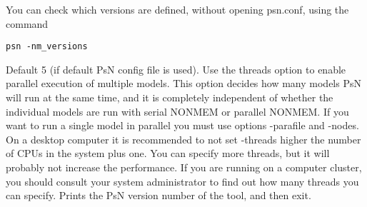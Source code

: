\begin{optionlist}
You can check which versions are defined, without opening psn.conf, using the command
\begin{verbatim}
psn -nm_versions
\end{verbatim}
\nextopt
{}
Default 5 (if default PsN config file is used). 
Use the threads option to enable parallel execution of multiple models.
This option decides how many models PsN will run at the same time, and it is completely
independent of whether the individual models are run with serial NONMEM or parallel NONMEM.
If you want to run a single model in parallel you must use options -parafile and -nodes.
On a desktop computer it 
is recommended to not set -threads higher the number of CPUs in the system plus one. 
You can specify more threads, 
but it will probably not increase the performance. If you are running on a computer cluster, 
you should consult your 
system administrator to find out how many threads you can specify. 
\nextopt
{}
Prints the PsN version number of the tool, and then exit. 
\nextopt
\end{optionlist}
